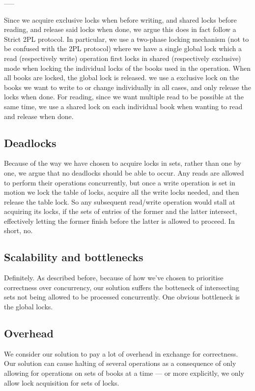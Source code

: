 -----

Since we acquire exclusive locks when before writing, and shared locks before reading, and release said locks when done, we argue this does in fact follow a Strict 2PL protocol. In particular, we use a two-phase locking mechanism (not to be confused with the 2PL protocol) where we have a single global lock which a read (respectively write) operation first locks in shared (respectively exclusive) mode when locking the individual locks of the books used in the operation. When all books are locked, the global lock is released. we use a exclusive lock on the books we want to write to or change individually in all cases, and only release the locks when done. For reading, since we want multiple read to be possible at the same time, we use a shared lock on each individual book when wanting to read and release when done.

\subsection{Deadlocks}
Because of the way we have chosen to acquire locks in sets, rather than one by
one, we argue that no deadlocks should be able to occur. Any reads are allowed
to perform their operations concurrently, but once a write operation is set in
motion we lock the table of locks, acquire all the write locks needed, and then
release the table lock. So any subsequent read/write operation would stall at
acquiring its locks, if the sets of entries of the former and the latter
intersect, effectively letting the former finish before the latter is allowed
to proceed. In short, no.

\subsection{Scalability and bottlenecks}
Definitely. As described before, because of how we've chosen to prioritise
correctness over concurrency, our solution suffers the botteneck of intersecting
sets not being allowed to be processed concurrently.
One obvious bottleneck is the global locks.

\subsection{Overhead}
We consider our solution to pay a lot of overhead in exchange for correctness.
Our solution can cause halting of several operations as a consequence of only
allowing for operations on sets of books at a time --- or more explicitly, we
only allow lock acquisition for sets of locks.


